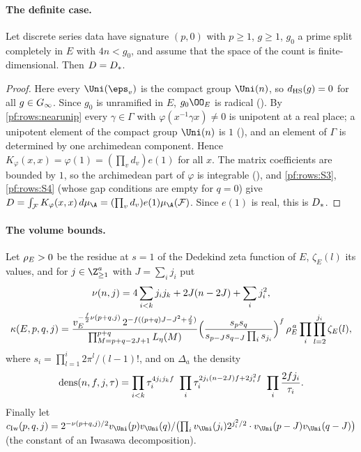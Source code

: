 \paragraph{The definite case.}

\begin{lemma}\label{pf:rows:definite}
Let discrete series data have signature $(p,0)$ with $p\ge1$, $g\ge1$, $g_0$ a prime split completely in $E$ with
$4n<g_0$, and assume that the space of the count is finite-dimensional. Then $D=D_*$.
\end{lemma}

\begin{proof}
Here every $\Uni(\eps_v)$ is the compact group $\Uni(n)$, so $d_{\mathrm{HS}}(g)=0$ for all $g\in G_\infty$. Since $g_0$ is unramified
in $E$, $g_0\OO_E$ is radical (). By
\cref{pf:rows:nearunip} every $\gamma\in\Gamma$ with $\varphi(x^{-1}\gamma x)\ne0$ is unipotent at a real place; a unipotent element of
the compact group $\Uni(n)$ is $1$ (), and an element of $\Gamma$ is
determined by one archimedean component. Hence $K_\varphi(x,x)=\varphi(1)=(\prod_vd_v)e(1)$ for all $x$. The matrix coefficients
are bounded by $1$, so the archimedean part of $\varphi$ is integrable
(), and \ref{pf:rows:S3},
\ref{pf:rows:S4} (whose gap conditions are empty for $q=0$) give
$\rowsDc=\int_{\mathcal F}K_\varphi(x,x)\,d\mu_{\A}=(\prod_vd_v)e(1)\mu_{\A}(\mathcal F)$. Since $e(1)$ is real, this is $D_*$.
\end{proof}

\paragraph{The volume bounds.}
Let $\rho_E>0$ be the residue at $s=1$ of the Dedekind zeta function of $E$, $\zeta_E(l)$ its values, and for
$j\in\Z_{\ge1}^a$ with $J=\sum_ij_i$ put
\begin{gather*}
\nu(n,j)=4\sum_{i<k}j_ij_k+2J(n-2J)+\sum_ij_i^2,\\
\kappa(E,p,q,j)=\frac{v_E^{-\frac f2\nu(p+q,j)}\,2^{-f((p+q)J-J^2+\frac J2)}}{\prod_{M=p+q-2J+1}^{p+q}L_\eta(M)}
\Bigl(\frac{s_ps_q}{s_{p-J}s_{q-J}\prod_is_{j_i}}\Bigr)^{f}\,\rho_E^{\,a}\prod_i\prod_{l=2}^{j_i}\zeta_E(l),
\end{gather*}
where $s_i=\prod_{l=1}^i2\pi^l/(l-1)!$, and on $\Delta_a$ the density
\[
\rowsdens(n,f,j,\tau)=\prod_{i<k}\tau_i^{4j_ij_kf}\ \prod_i\tau_i^{2j_i(n-2J)f+2j_i^2f}\ \prod_i\frac{2fj_i}{\tau_i}.
\]
Finally let
$c_{\mathrm{Iw}}(p,q,j)=2^{-\rowsdimN(p+q,j)/2}\rowsvU(p)\rowsvU(q)/\bigl(\prod_i\rowsvU(j_i)2^{j_i^2/2}\cdot\rowsvU(p-J)\rowsvU(q-J)\bigr)$
(the constant of an Iwasawa decomposition).

